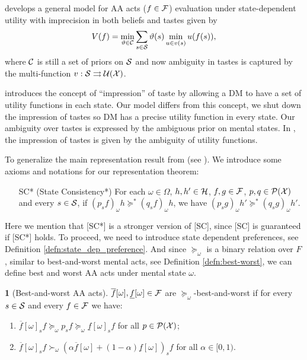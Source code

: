 \documentclass[11pt,oneside]{article}
\theoremstyle{plain}
\theoremstyle{plain}
\theoremstyle{plain}
\theoremstyle{plain}
\theoremstyle{plain}
\theoremstyle{definition}
\newtheorem{defn}[thm]{\protect\definitionname}
\theoremstyle{definition}
\theoremstyle{remark}
\theoremstyle{plain}
\providecommand{\definitionname}{Definition}
\newcommand{\F}{{\cal F}}
\newcommand{\ulf}{\underline{f}}
\newcommand{\olf}{\overline{f}}
\newcommand{\pfo}{\pf_\omega}
\newcommand{\calpx}{{\cal P}({\cal X})}
\newcommand{\mcs}{{\cal S}}
\newcommand{\pf}{\succeq}
\newcommand{\pfs}{\succeq^*}
\newcommand{\convmix}[2]{\alpha #1 + (1-\alpha) #2}
\newcommand{\smix}[2]{#1_s #2 }
\newcommand{\omix}[2]{#1_\omega #2 }
\begin{document}
\cite{hill2019non} develops a general model for AA acts ($f \in \F$) evaluation under state-dependent utility with imprecision in both beliefs and tastes given by
%
\begin{equation}
\label{eq:hill}
V(f) = \min_{\vartheta \in {\cal C}} \sum_{s \in \mcs} \vartheta(s) \min_{u \in v(s)} u(f(s)),
\end{equation}
%
where ${\cal C}$ is still a set of priors on $\mcs$ and now ambiguity in tastes is captured by the multi-function $v : \mcs \rightrightarrows {\cal U}({\cal X})$.

\cite{hill2019non} introduces the concept of ``impression'' of taste by allowing a DM to have a set of utility functions in each state.
Our model differs from this concept, we shut down the impression of tastes so DM has a precise utility function in every state. Our ambiguity over tastes is expressed by the ambiguous prior on mental states. In \cite{hill2019non}, the impression of tastes is given by the ambiguity of utility functions.

To generalize  the main representation result from \cite{hill2019non} (see \cite[Theorem 1]{hill2019non}). We introduce some axioms and notations for our representation theorem:
%
\begin{itemize}
    \item [SC*] (State Consistency*) For each $\omega \in \Omega$, $h,h'\in {\cal H}$, $f,g \in \F$, $p,q \in \calpx$ and every $s\in \mcs$, if $\omix{(p_s f)}{h} \pfs \omix{(q_s f)}{h}$, we have
    $\omix{(p_s g)}{h'} \pfs \omix{(q_s g)}{h'}$.
\end{itemize}

Here we mention that [SC*] is a stronger version of [SC], since [SC] is guaranteed if [SC*] holds. To proceed, we need to introduce state dependent preferences, see Definition \ref{defn:state_dep_preference}. And since
$\pfo$ is a binary relation over $F$, similar to best-and-worst mental acts, see Definition \ref{defn:best-worst}, we can define best and worst AA acts under mental state $\omega$.
\begin{defn}[Best-and-worst AA acts]
\label{defn:best-worst_AA_acts}
$\olf[\omega],\ulf[\omega] \in \F$ are $\pfo$-best-and-worst if for every $s\in \mcs$ and every $f\in \F$ we have:
\begin{enumerate}
    \item $\olf[\omega]_s f \pfo \smix{p}{f} \pfo \smix{\ulf[\omega]}{f}$ for all $p \in \calpx$;
    \item $\smix{\olf[\omega]}{f} \succ_\omega \smix{\left(\convmix{\olf[\omega]}{\ulf[\omega]}\right)}{f}$ for all $\alpha \in [0,1).$
\end{enumerate} 
\end{defn}
\end{document}
